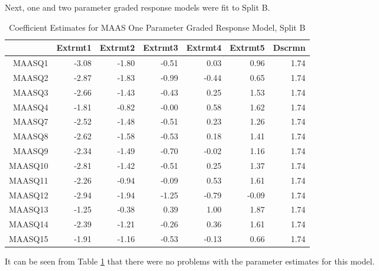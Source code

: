 \documentclass{article}
\begin{document}
Next, one and two parameter graded response models were fit to Split B. 



\begin{table}[ht]
\centering
\begin{tabular}{rrrrrrr}
  \hline
 & Extrmt1 & Extrmt2 & Extrmt3 & Extrmt4 & Extrmt5 & Dscrmn \\ 
  \hline
MAASQ1 & -3.08 & -1.80 & -0.51 & 0.03 & 0.96 & 1.74 \\ 
  MAASQ2 & -2.87 & -1.83 & -0.99 & -0.44 & 0.65 & 1.74 \\ 
  MAASQ3 & -2.66 & -1.43 & -0.43 & 0.25 & 1.53 & 1.74 \\ 
  MAASQ4 & -1.81 & -0.82 & -0.00 & 0.58 & 1.62 & 1.74 \\ 
  MAASQ7 & -2.52 & -1.48 & -0.51 & 0.23 & 1.26 & 1.74 \\ 
  MAASQ8 & -2.62 & -1.58 & -0.53 & 0.18 & 1.41 & 1.74 \\ 
  MAASQ9 & -2.34 & -1.49 & -0.70 & -0.02 & 1.16 & 1.74 \\ 
  MAASQ10 & -2.81 & -1.42 & -0.51 & 0.25 & 1.37 & 1.74 \\ 
  MAASQ11 & -2.26 & -0.94 & -0.09 & 0.53 & 1.61 & 1.74 \\ 
  MAASQ12 & -2.94 & -1.94 & -1.25 & -0.79 & -0.09 & 1.74 \\ 
  MAASQ13 & -1.25 & -0.38 & 0.39 & 1.00 & 1.87 & 1.74 \\ 
  MAASQ14 & -2.39 & -1.21 & -0.26 & 0.36 & 1.61 & 1.74 \\ 
  MAASQ15 & -1.91 & -1.16 & -0.53 & -0.13 & 0.66 & 1.74 \\ 
   \hline
\end{tabular}
\caption{Coefficient Estimates for MAAS One Parameter Graded Response Model, Split B} 
\label{tab:maas2bgrm1pl}
\end{table}

It can be seen from Table \ref{tab:maas2bgrm1pl} that there were no problems with the parameter estimates for this model. 
\end{document}
